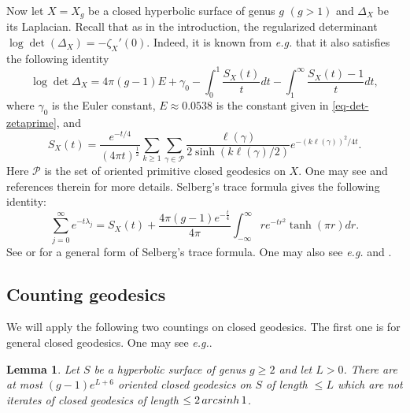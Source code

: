 \documentclass[11pt]{amsart}
\makeatletter
\newcommand{\eg}{\textit{e.g.\@ }}
\def\arcsinh{\mathop{\rm arcsinh}}
\theoremstyle{plain}
\newtheorem{lemma}[theorem]{Lemma}
\theoremstyle{definition}
\theoremstyle{remark}
\makeatother
\begin{document}
Now let $X=X_g$ be a closed hyperbolic surface of genus $g$ $(g>1)$ and $\Delta_X$ be its Laplacian. Recall that as in the introduction, the regularized determinant $\log \det (\Delta_X)=-\zeta_X'(0)$. Indeed, it is known from \eg \cite{HP86, sarnak1987determinants, naud2023determinants} that it also satisfies the following identity
\begin{equation}\label{eq-def-logdetlaplace}
\log \det\Delta_X=4\pi(g-1)E+\gamma_0-\int_{0}^1\frac{S_X(t)}{t}dt-\int_1^\infty\frac{S_X(t)-1}{t}dt,
\end{equation}
where $\gamma_0$ is the Euler constant, $E\approx 0.0538$ is the constant given in \eqref{eq-det-zetaprime}, and $$S_X(t)=\frac{e^{-t/4}}{(4\pi t)^\frac{1}{2}}\sum_{k\geq 1}\sum_{\gamma\in \mathcal{P}} \frac{\ell(\gamma)}{2\sinh(k\ell(\gamma)/2)}e^{-(k\ell(\gamma))^2/4t}.$$ Here $\mathcal{P}$ is the set of oriented primitive closed geodesics on $X$.
One may see \cite{naud2023determinants} and references therein for more details.
Selberg's trace formula gives the following identity:
\begin{equation}\label{sel-trace-formula}
    \sum_{j=0}^\infty e^{-t\lambda_j}=S_X(t)+\frac{4\pi(g-1)e^{-\frac{t}{4}}}{4\pi}\int_{-\infty}^{\infty}re^{-tr^2}\tanh(\pi r)dr.
\end{equation}
See \cite[Theorem 9.5.3]{buser2010geometry} 
 or \cite[Theorem 5.6]{bergeron2016spectrum} for a 
general form of Selberg's trace formula. One may also see \eg \cite{selberg1956harmonic} and \cite{hejhal2006selberg}.



\subsection{Counting geodesics} We will apply the following two countings on closed geodesics. The first one is for general closed geodesics. One may see \eg \cite[Lemma 6.6.4]{buser2010geometry}.
\begin{lemma}\label{counting in buser}Let $S$ be a hyperbolic surface of genus $g\geq 2$ and let $L>0$. There are at most $(g-1)e^{L+6}$ oriented closed geodesics on $S$ of length $\leq L$ which are not iterates of closed geodesics of length $\leq 2\arcsinh 1$.
\end{lemma}
\end{document}
